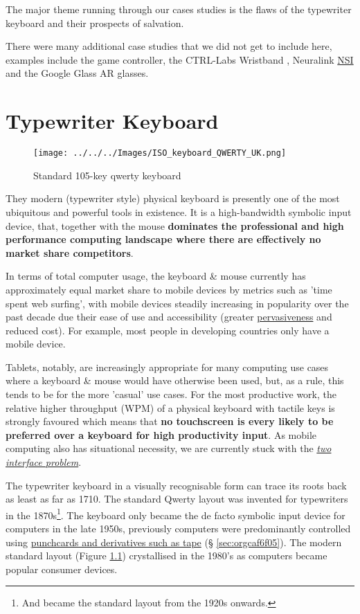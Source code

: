 \documentclass[logo,bsc,singlespacing,parskip]{infthesis}
\begin{document}
The major theme running through our cases studies is the flaws of the typewriter keyboard and their prospects of salvation.

There were many additional case studies that we did not get to include here, examples include the game controller, the CTRL-Labs Wristband \autocite{27CTRLlabsLinkedIn}, Neuralink \hyperref[org559faaa]{NSI} \autocite{muskNeuralink} and the Google Glass AR glasses.
\chapter{Typewriter Keyboard}
\label{sec:org85cc7e5}
\begin{figure}[h]
\centering
\texttt{[image: ../../../Images/ISO\_keyboard\_QWERTY\_UK.png]}
\caption{\label{fig:stand_keyb}Standard 105-key qwerty keyboard}
\end{figure}

They modern (typewriter style) physical keyboard is presently one of the most ubiquitous and powerful tools in existence.
It is a high-bandwidth symbolic input device, that, together with the mouse \textbf{dominates the professional and high performance computing landscape where there are effectively no market share competitors}.

In terms of total computer usage, the keyboard \& mouse currently has approximately equal market share to mobile devices by metrics such as 'time spent web surfing', with mobile devices steadily increasing in popularity over the past decade due their ease of use and accessibility (greater \hyperref[pervasiveness]{pervasiveness} and reduced cost).
For example, most people in developing countries only have a mobile device.

Tablets, notably, are increasingly appropriate for many computing use cases where a keyboard \& mouse would have otherwise been used, but, as a rule, this tends to be for the more 'casual' use cases.
For the most productive work, the relative higher throughput (WPM) of a physical keyboard with tactile keys is strongly favoured which means that \textbf{no touchscreen is every likely to be preferred over a keyboard for high productivity input}.
As mobile computing also has situational necessity, we are currently stuck with the \emph{\hyperref[two interface problem]{two interface problem}}.

The typewriter keyboard in a visually recognisable form can trace its roots back as least as far as 1710.
The standard Qwerty layout was invented for typewriters in the 1870s\footnote{And became the standard layout from the 1920s onwards.}.
The keyboard only became the de facto symbolic input device for computers in the late 1950s, previously computers were predominantly controlled using \hyperref[sec:orgcaf6f05]{punchcards and derivatives such as tape} (§ \ref{sec:orgcaf6f05}).
The modern standard layout (Figure \ref{fig:stand_keyb}) crystallised in the 1980's as computers became popular consumer devices.
\end{document}
